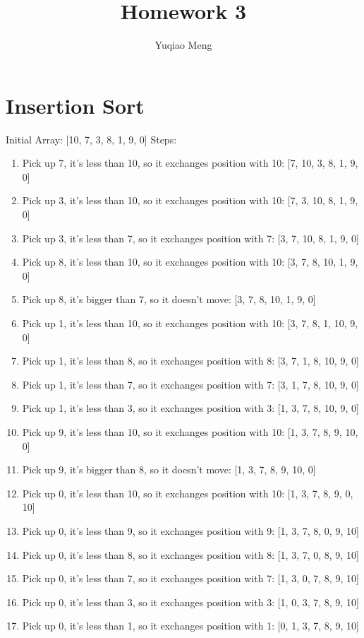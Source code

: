 \documentclass[12pt]{article}
\title{Homework 3}
\author{Yuqiao Meng}
\begin{document}
\maketitle

\section{Insertion Sort}
Initial Array: [10, 7, 3, 8, 1, 9, 0]
\newline
Steps:
\begin{enumerate}
    \item Pick up 7, it's less than 10, so it exchanges position with 10: [{\color{red}7}, 10, 3, 8, 1, 9, 0]
    \item Pick up 3, it's less than 10, so it exchanges position with 10: [7, {\color{red}3}, 10, 8, 1, 9, 0]
    \item Pick up 3, it's less than 7, so it exchanges position with 7: [{\color{red}3}, 7, 10, 8, 1, 9, 0]
    \item Pick up 8, it's less than 10, so it exchanges position with 10: [3, 7, {\color{red}8}, 10, 1, 9, 0]
    \item Pick up 8, it's bigger than 7, so it doesn't move: [3, 7, {\color{red}8}, 10, 1, 9, 0]
    \item Pick up 1, it's less than 10, so it exchanges position with 10: [3, 7, 8, {\color{red}1}, 10, 9, 0]
    \item Pick up 1, it's less than 8, so it exchanges position with 8: [3, 7, {\color{red}1}, 8, 10, 9, 0]
    \item Pick up 1, it's less than 7, so it exchanges position with 7: [3, {\color{red}1}, 7, 8, 10, 9, 0]
    \item Pick up 1, it's less than 3, so it exchanges position with 3: [{\color{red}1}, 3, 7, 8, 10, 9, 0]
    \item Pick up 9, it's less than 10, so it exchanges position with 10: [1, 3, 7, 8, {\color{red}9}, 10, 0]
    \item Pick up 9, it's bigger than 8, so it doesn't move: [1, 3, 7, 8, {\color{red}9}, 10, 0]
    \item Pick up 0, it's less than 10, so it exchanges position with 10: [1, 3, 7, 8, 9, {\color{red}0}, 10]
    \item Pick up 0, it's less than 9, so it exchanges position with 9: [1, 3, 7, 8, {\color{red}0}, 9, 10]
    \item Pick up 0, it's less than 8, so it exchanges position with 8: [1, 3, 7, {\color{red}0}, 8, 9, 10]
    \item Pick up 0, it's less than 7, so it exchanges position with 7: [1, 3, {\color{red}0}, 7, 8, 9, 10]
    \item Pick up 0, it's less than 3, so it exchanges position with 3: [1, {\color{red}0}, 3, 7, 8, 9, 10]
    \item Pick up 0, it's less than 1, so it exchanges position with 1: [{\color{red}0}, 1, 3, 7, 8, 9, 10]
\end{enumerate}
\end{document}
